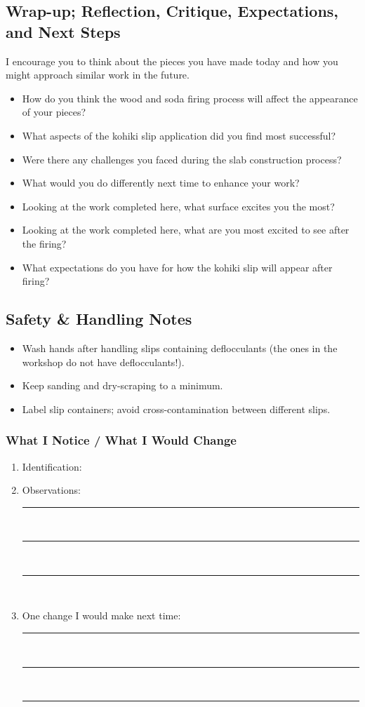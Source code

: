 \documentclass[12pt]{scrartcl}
\begin{document}
\subsection*{Wrap-up; Reflection, Critique, Expectations, and Next Steps}
I encourage you to think about the pieces you have made today and how you might approach similar work in the future.  
\begin{itemize}
  \item How do you think the wood and soda firing process will affect the appearance of your pieces?
  \item What aspects of the kohiki slip application did you find most successful?
  \item Were there any challenges you faced during the slab construction process?
  \item What would you do differently next time to enhance your work?
  \item Looking at the work completed here, what surface excites you the most?
  \item Looking at the work completed here, what are you most excited to see after the firing?
  \item What expectations do you have for how the kohiki slip will appear after firing?
\end{itemize}

\clearpage
\subsection*{Safety \& Handling Notes}
\begin{itemize}
  \item Wash hands after handling slips containing deflocculants (the ones in the workshop do not have deflocculants!).
  \item Keep sanding and dry-scraping to a minimum.
  \item Label slip containers; avoid cross-contamination between different slips.
\end{itemize}

\subsubsection*{What I Notice / What I Would Change}
\begin{enumerate}
  \item \rule{0pt}{1cm}Identification: \hrulefill\\
  \item Observations: \hrulefill\\[16pt] \rule{\linewidth}{0.4pt}\\[16pt] \rule{\linewidth}{0.4pt}\\[16pt] \rule{\linewidth}{0.4pt}\\[6pt]
  \item One change I would make next time: \hrulefill\\[16pt] \rule{\linewidth}{0.4pt}\\[16pt] \rule{\linewidth}{0.4pt}\\[16pt] \rule{\linewidth}{0.4pt}
\end{enumerate}
\end{document}
